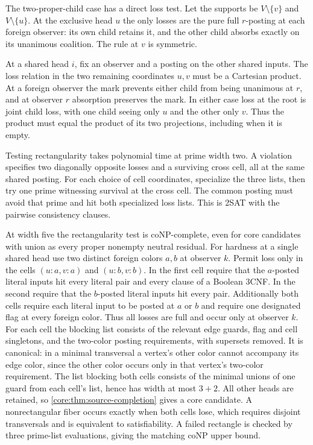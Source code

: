The two-proper-child case has a direct loss test.
Let the supports be $V\setminus\{v\}$ and
$V\setminus\{u\}$. At the exclusive head $u$ the
only losses are the pure full $r$-posting at each
foreign observer: its own child retains it, and
the other child absorbs exactly on its unanimous
coalition. The rule at $v$ is symmetric.

At a shared head $i$, fix an observer and a posting
on the other shared inputs. The loss relation in
the two remaining coordinates $u,v$ must be a
Cartesian product. At a foreign observer the mark
prevents either child from being unanimous at $r$,
and at observer $r$ absorption preserves the mark.
In either case loss at the root is joint child loss,
with one child seeing only $u$ and the other only
$v$. Thus the product must equal the product of
its two projections, including when it is empty.

Testing rectangularity takes polynomial time at
prime width two. A violation specifies two
diagonally opposite losses and a surviving cross
cell, all at the same shared posting. For each
choice of cell coordinates, specialize the three
lists, then try one prime witnessing survival at
the cross cell. The common posting must avoid
that prime and hit both specialized loss lists.
This is 2SAT with the pairwise consistency clauses.

At width five the rectangularity test is
coNP-complete, even for core candidates with
union as every proper nonempty neutral residual.
For hardness at a single shared head use two
distinct foreign colors $a,b$ at observer $k$.
Permit loss only in the cells $(u:a,v:a)$ and
$(u:b,v:b)$. In the first cell require that the
$a$-posted literal inputs hit every literal pair
and every clause of a Boolean 3CNF. In the second
require that the $b$-posted literal inputs hit
every pair. Additionally both cells require each
literal input to be posted at $a$ or $b$ and
require one designated flag at every foreign
color. Thus all losses are full and occur only
at observer $k$. For each cell the blocking list
consists of the relevant edge guards, flag and
cell singletons, and the two-color posting
requirements, with supersets removed. It is
canonical: in a minimal transversal a vertex's
other color cannot accompany its edge color,
since the other color occurs only in that
vertex's two-color requirement. The list blocking
both cells consists of the minimal unions of
one guard from each cell's list, hence has width
at most $3+2$. All other heads are retained, so
\cref{core:thm:source-completion} gives a
core candidate. A nonrectangular fiber occurs
exactly when both cells lose, which requires
disjoint transversals and is equivalent to
satisfiability. A failed rectangle is checked
by three prime-list evaluations, giving the
matching coNP upper bound.


